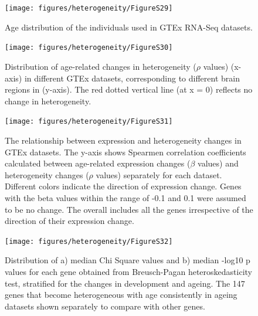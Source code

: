 \documentclass[12pt,twoside]{unicam}
\begin{document}
\begin{figure}

{\centering \texttt{[image: figures/heterogeneity/FigureS29]} 

}

\caption[Age distribution of the individuals used in GTEx RNA-Seq datasets.]{Age distribution of the individuals used in GTEx RNA-Seq datasets.}\label{fig:hetFigS29}
\end{figure}

\begin{figure}

{\centering \texttt{[image: figures/heterogeneity/FigureS30]} 

}

\caption[Distribution of age-related changes in heterogeneity ($\rho$ values)in different GTEx datasets, corresponding to different brain regions.]{Distribution of age-related changes in heterogeneity ($\rho$ values) (x-axis) in different GTEx datasets, corresponding to different brain regions in (y-axis). The red dotted vertical line (at x = 0) reflects no change in heterogeneity. }\label{fig:hetFigS30}
\end{figure}

\begin{figure}

{\centering \texttt{[image: figures/heterogeneity/FigureS31]} 

}

\caption[The relationship between expression and heterogeneity changes in GTEx datasets.]{The relationship between expression and heterogeneity changes in GTEx datasets. The y-axis shows Spearmen correlation coefficients calculated between age-related expression changes ($\beta$ values) and heterogeneity changes ($\rho$ values) separately for each dataset. Different colors indicate the direction of expression change. Genes with the beta values within the range of -0.1 and 0.1 were assumed to be no change. The overall includes all the genes irrespective of the direction of their expression change.}\label{fig:hetFigS31}
\end{figure}

\begin{figure}

{\centering \texttt{[image: figures/heterogeneity/FigureS32]} 

}

\caption[Confirmation of the results using Breusch-Pagan test.]{Distribution of a) median Chi Square values and b) median -log10 p values for each gene obtained from Breusch-Pagan heteroskedasticity test, stratified for the changes in development and ageing. The 147 genes that become heterogeneous with age consistently in ageing datasets shown  separately to compare with other genes.}\label{fig:hetFigS32}
\end{figure}
\end{document}
